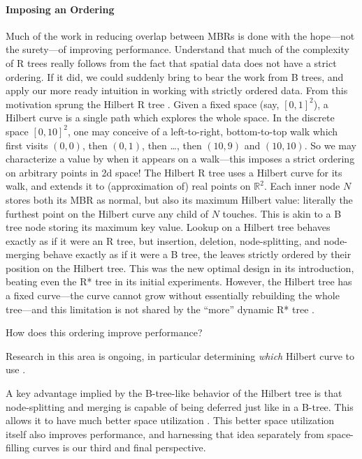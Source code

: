 \paragraph{Imposing an Ordering}
Much of the work in reducing overlap between MBRs is done with the hope---not the surety---of improving performance.
Understand that much of the complexity of R trees really follows from the fact that spatial data does not have a strict ordering.
If it did, we could suddenly bring to bear the work from B trees, and apply our more ready intuition in working with strictly ordered data.
From this motivation sprung the Hilbert R tree \cite{kamelfaloutsos94}.
Given a fixed space (say, $[0,1]^2$), a Hilbert curve \cite{hilbert91} is a single path which explores the whole space.
In the discrete space $[0,10]^2$, one may conceive of a left-to-right, bottom-to-top walk which first visits $(0,0)$, then $(0,1)$, then \ldots, then $(10,9)$ and $(10,10)$.
So we may characterize a value by when it appears on a walk---this imposes a strict ordering on arbitrary points in 2d space!
The Hilbert R tree uses a Hilbert curve for its walk, and extends it to (approximation of) real points on $\mathbb R^2$.
Each inner node $N$ stores both its MBR as normal, but also its maximum Hilbert value: literally the furthest point on the Hilbert curve any child of $N$ touches.
This is akin to a B tree node storing its maximum key value.
Lookup on a Hilbert tree behaves exactly as if it were an R tree, but insertion, deletion, node-splitting, and node-merging behave exactly as if it were a B tree, the leaves strictly ordered by their position on the Hilbert tree.
This was the new optimal design in its introduction, beating even the R* tree in its initial experiments.
However, the Hilbert tree has a fixed curve---the curve cannot grow without essentially rebuilding the whole tree---and this limitation is not shared by the ``more'' dynamic R* tree \cite{beckmannseeger09}.

How does this ordering improve performance?

Research in this area is ongoing, in particular determining \emph{which} Hilbert curve to use \cite{haverkortwalderveen11}.

A key advantage implied by the B-tree-like behavior of the Hilbert tree is that node-splitting and merging is capable of being deferred just like in a B-tree.
This allows it to have much better space utilization \cite{kamelfaloutsos94}.
This better space utilization itself also improves performance, and harnessing that idea separately from space-filling curves is our third and final perspective.

